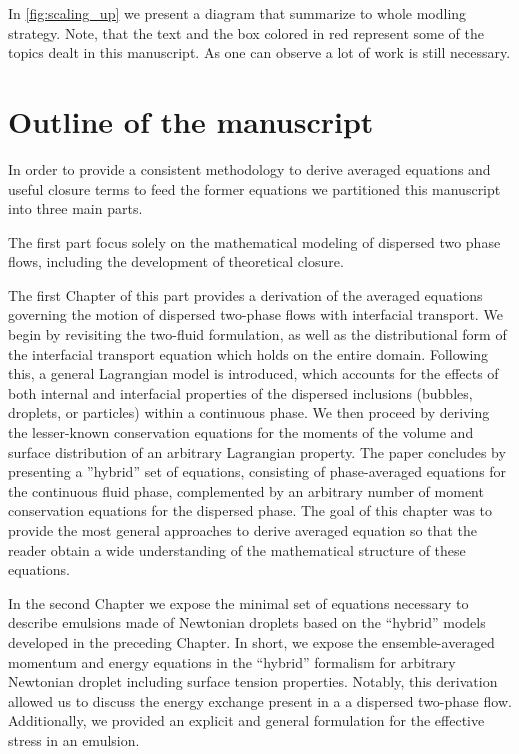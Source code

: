 In \ref{fig:scaling_up} we present a diagram that summarize to whole modling strategy. 
Note, that the text and the box colored in red represent some of the topics dealt in this manuscript. 
As one can observe a lot of work is still necessary. 


\section{Outline of the manuscript}


In order to provide a consistent methodology to derive averaged equations and useful closure terms to feed the former equations we partitioned this manuscript into three main parts. 

The first part focus solely on the mathematical modeling of dispersed two phase flows, including the development of theoretical closure. 

The first Chapter of this part provides a derivation of the averaged equations governing the motion of dispersed two-phase ﬂows with interfacial transport. 
We begin by revisiting the two-ﬂuid formulation, as well as the distributional form of the interfacial transport equation which holds on the entire domain. 
Following this, a general Lagrangian model is introduced, which accounts for the eﬀects of both internal and interfacial properties of the dispersed inclusions (bubbles, droplets, or particles) within a continuous phase.
We then proceed by deriving the lesser-known conservation equations for the moments of the volume and surface distribution of an arbitrary Lagrangian property.
The paper concludes by presenting a ”hybrid” set of equations, consisting of phase-averaged equations for the continuous ﬂuid phase, complemented by an arbitrary number of moment conservation equations for the dispersed phase.
The goal of this chapter was to provide the most general approaches to derive averaged equation so that the reader obtain a wide understanding of the mathematical structure of these equations. 

In the second Chapter we expose the minimal set of equations necessary to describe emulsions made of Newtonian droplets based on the ``hybrid'' models developed in the preceding Chapter. 
In short, we expose the ensemble-averaged momentum and energy equations in the ``hybrid'' formalism for arbitrary Newtonian droplet including surface tension properties. 
Notably, this derivation allowed us to discuss the energy exchange present in a a dispersed two-phase flow. 
Additionally, we provided an explicit and general formulation for the effective stress in an emulsion. 

